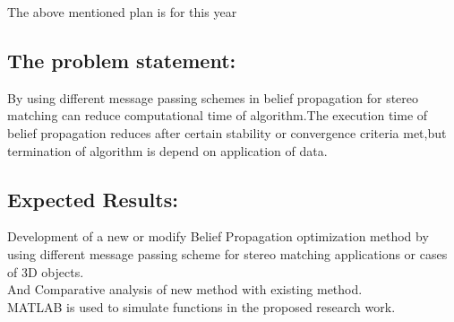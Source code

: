 The above mentioned plan is for this year\\
\subsection{The problem statement:}
By using different message passing schemes in belief propagation for stereo matching  can reduce computational time of algorithm.The execution time of belief propagation reduces after certain stability or convergence criteria met,but termination of algorithm is depend on  application of data.
\subsection{Expected Results:}
Development of a new or modify Belief Propagation optimization method by using different message passing scheme for stereo matching applications or cases of 3D objects.\\ And  Comparative analysis of new method with existing method.\\
 MATLAB is used to simulate functions in the proposed  research work.



